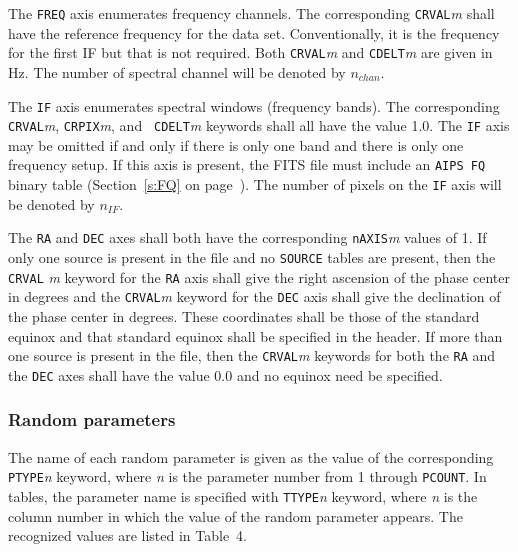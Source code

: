 \documentclass[twoside]{article}
\newcommand{\nif}{$n_{IF}$}
\newcommand{\nchan}{$n_{chan}$}
\begin{document}
The {\tt FREQ} axis enumerates frequency channels.  The corresponding
{\tt CRVAL}{\it m} shall have the reference frequency for the data
set.  Conventionally, it is the frequency for the first IF but that is
not required.  Both {\tt CRVAL}{\it m} and {\tt CDELT}{\it m} are
given in Hz.  The number of spectral channel will be denoted by \nchan.

The {\tt IF} axis enumerates spectral windows (frequency bands).  The
corresponding {\tt CRVAL}{\it m}, {\tt CRPIX}{\it m}, and {\tt
  CDELT}{\it m} keywords shall all have the value 1.0.  The {\tt IF}
axis may be omitted if and only if there is only one band and there is
only one frequency setup.  If this axis is present, the FITS file must
include an {\tt AIPS FQ} binary table (Section~\ref{s:FQ} on
page~\pageref{s:FQ}).  The number of pixels on the {\tt IF} axis will
be denoted by \nif.

The {\tt RA} and {\tt DEC} axes shall both have the corresponding
{\tt nAXIS}{\it m} values of 1.  If only one source is present in the
file and no {\tt SOURCE} tables are present, then the {\tt CRVAL}{\it
  m} keyword for the {\tt RA} axis shall give the right ascension of
the phase center in degrees and the {\tt CRVAL}{\it m} keyword for the
{\tt DEC} axis shall give the declination of the phase center in
degrees.  These coordinates shall be those of the standard equinox and
that standard equinox shall be specified in the header.  If more than
one source is present in the file, then the {\tt CRVAL}{\it m}
keywords for both the {\tt RA} and the {\tt DEC} axes shall have the
value 0.0 and no equinox need be specified.

\subsubsection{Random parameters}
\label{RGranpar}

The name of each random parameter is given as the value of the
corresponding {\tt PTYPE}{\it n} keyword, where {\it n} is the
parameter number from 1 through {\tt PCOUNT}\@.  In tables, the
parameter name is specified with {\tt TTYPE}{\it n} keyword, where
{\it n} is the column number in which the value of the random
parameter appears.  The recognized values are listed in Table~4.
\end{document}
